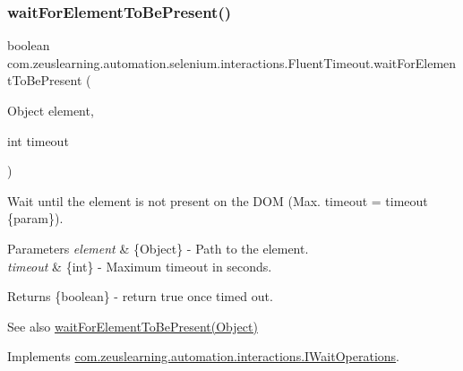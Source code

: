 \subsubsection{\texorpdfstring{wait\+For\+Element\+To\+Be\+Present()}{waitForElementToBePresent()}\hspace{0.1cm}{\footnotesize\ttfamily [2/2]}}
{\footnotesize\ttfamily boolean com.\+zeuslearning.\+automation.\+selenium.\+interactions.\+Fluent\+Timeout.\+wait\+For\+Element\+To\+Be\+Present (\begin{DoxyParamCaption}\item[{Object}]{element,  }\item[{int}]{timeout }\end{DoxyParamCaption})\hspace{0.3cm}{\ttfamily [inline]}}

Wait until the element is not present on the D\+OM (Max. timeout = timeout \{param\}).


\begin{DoxyParams}{Parameters}
{\em element} & \{Object\} -\/ Path to the element. \\
\hline
{\em timeout} & \{int\} -\/ Maximum timeout in seconds.\\
\hline
\end{DoxyParams}
\begin{DoxyReturn}{Returns}
\{boolean\} -\/ return {\ttfamily true} once timed out.
\end{DoxyReturn}
\begin{DoxySeeAlso}{See also}
\hyperlink{classcom_1_1zeuslearning_1_1automation_1_1selenium_1_1interactions_1_1FluentTimeout_a83338a2e6ff1028ec988d6122e4afeab}{wait\+For\+Element\+To\+Be\+Present(\+Object)} 
\end{DoxySeeAlso}


Implements \hyperlink{interfacecom_1_1zeuslearning_1_1automation_1_1interactions_1_1IWaitOperations_a768e53257a1c960d74e048b1aa5fe145}{com.\+zeuslearning.\+automation.\+interactions.\+I\+Wait\+Operations}.

\hypertarget{classcom_1_1zeuslearning_1_1automation_1_1selenium_1_1interactions_1_1FluentTimeout_ad385151878bb0bd5e034cb4769c206f5}{}\label{classcom_1_1zeuslearning_1_1automation_1_1selenium_1_1interactions_1_1FluentTimeout_ad385151878bb0bd5e034cb4769c206f5} 

